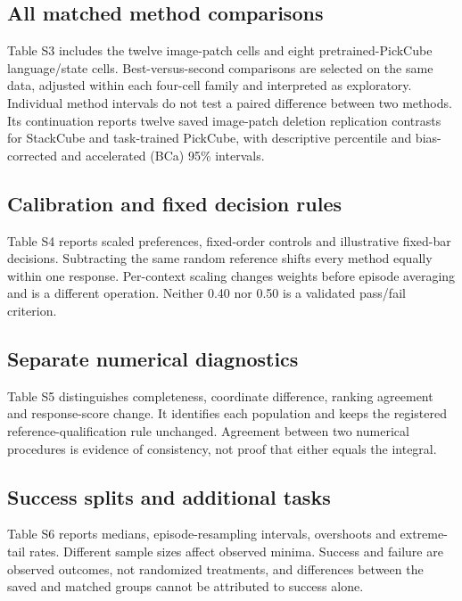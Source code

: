 \documentclass[12pt,letterpaper]{article}
\begin{document}
\clearpage
\subsection{All matched method comparisons}
Table S3 includes the twelve image-patch cells and eight pretrained-PickCube language/state cells. Best-versus-second comparisons are selected on the same data, adjusted within each four-cell family and interpreted as exploratory. Individual method intervals do not test a paired difference between two methods. Its continuation reports twelve saved image-patch deletion replication contrasts for StackCube and task-trained PickCube, with descriptive percentile and bias-corrected and accelerated (BCa) 95\% intervals.


\clearpage
\subsection{Calibration and fixed decision rules}
Table S4 reports scaled preferences, fixed-order controls and illustrative fixed-bar decisions. Subtracting the same random reference shifts every method equally within one response. Per-context scaling changes weights before episode averaging and is a different operation. Neither 0.40 nor 0.50 is a validated pass/fail criterion.


\clearpage
\subsection{Separate numerical diagnostics}
Table S5 distinguishes completeness, coordinate difference, ranking agreement and response-score change. It identifies each population and keeps the registered reference-qualification rule unchanged. Agreement between two numerical procedures is evidence of consistency, not proof that either equals the integral.


\clearpage
\subsection{Success splits and additional tasks}
Table S6 reports medians, episode-resampling intervals, overshoots and extreme-tail rates. Different sample sizes affect observed minima. Success and failure are observed outcomes, not randomized treatments, and differences between the saved and matched groups cannot be attributed to success alone.

\end{document}
